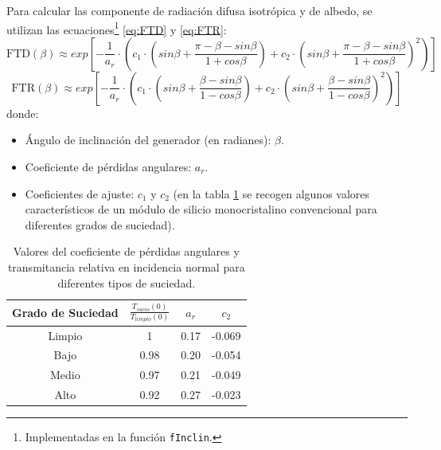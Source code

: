 Para calcular las componente de radiación difusa isotrópica y de albedo, se utilizan las ecuaciones\footnote{Implementadas en la función \texttt{fInclin}.} \ref{eq:FTD} y \ref{eq:FTR}:
\begin{equation}
\text{FTD}(\beta) \approx exp[-\frac{1}{a_r}\cdot (c_1\cdot (sin\beta +\frac{\pi -\beta - sin\beta}{1+cos\beta})+c_2\cdot (sin\beta +\frac{\pi -\beta -sin\beta}{1+cos\beta})^2)]
\label{eq:FTD}
\end{equation}
\begin{equation}
\text{FTR}(\beta) \approx exp[-\frac{1}{a_r}\cdot (c_1\cdot (sin\beta +\frac{\beta - sin\beta}{1-cos\beta})+c_2\cdot (sin\beta +\frac{\beta -sin\beta}{1-cos\beta})^2)]
\end{equation}
\label{eq:FTR}
donde:
\begin{itemize}
\item Ángulo de inclinación del generador (en radianes): \(\beta\). 
\item Coeficiente de pérdidas angulares: \(a_r\).
\item Coeficientes de ajuste: \(c_1\) y \(c_2\) (en la tabla \ref{tab:coef-perd} se recogen algunos valores característicos de un módulo de silicio monocristalino convencional para diferentes grados de suciedad).
\end{itemize}
\begin{table}
\caption{Valores del coeficiente de pérdidas angulares y transmitancia relativa
en incidencia normal para diferentes tipos de suciedad.\label{tab:coef-perd}}

\begin{tabular}{cccc}
\toprule 
Grado de Suciedad & $\frac{T_{sucio}(0)}{T_{limpio}(0)}$ & $a_{r}$ & $c_{2}$\tabularnewline
\midrule
\midrule 
Limpio & 1 & 0.17 & -0.069\tabularnewline
\midrule 
Bajo & 0.98 & 0.20 & -0.054\tabularnewline
\midrule 
Medio & 0.97 & 0.21 & -0.049\tabularnewline
\midrule 
Alto & 0.92 & 0.27 & -0.023\tabularnewline
\bottomrule
\end{tabular}
\end{table}

